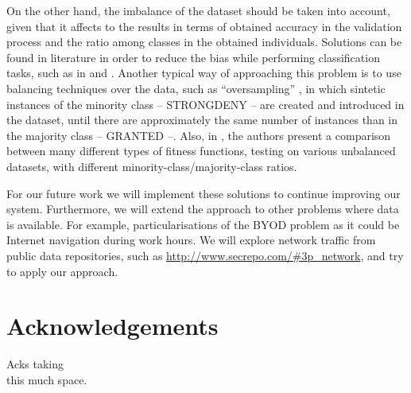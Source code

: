 \documentclass[runningheads]{llncs}
\begin{document}
On the other hand, the imbalance of the dataset should be taken into
account, given that it affects to the results in terms of obtained
accuracy in the validation process and the ratio among classes in the
obtained individuals. Solutions can be found in literature in order to reduce the bias while performing classification
tasks, such as in \cite{chawla2005data} and \cite{sun2009classification}. Another typical way of approaching this problem is to
use balancing techniques over the data, such as ``oversampling'' \cite{smote_02}, in
which sintetic instances of the minority class -- STRONGDENY -- are
created and introduced in the dataset, until there are approximately
the same number of instances than in the majority class -- GRANTED
--. Also, in \cite{bhowan2012developing}, the authors present a comparison between many different types of
fitness functions, testing on various unbalanced datasets, with
different minority-class/majority-class ratios.

For our future work we will implement these solutions to continue
improving our system. Furthermore, we will extend the approach to other problems where data is available. For example, particularisations of the BYOD problem as it could be Internet navigation during work hours. We will explore network traffic from public data repositories, such as \url{http://www.secrepo.com/#3p\_network}, and try to apply our approach. 

\section{Acknowledgements}

Acks taking\\
this much space.

      
   
\end{document}
